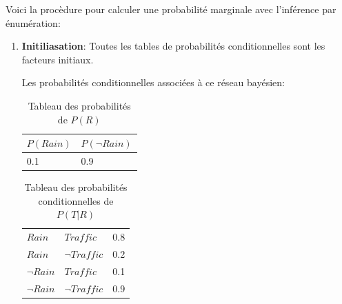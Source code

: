 Voici la procèdure pour calculer une probabilité marginale avec l'inférence par énumération: 

\begin{enumerate}
    \item \textbf{Initiliasation}: Toutes les tables de probabilités conditionnelles sont les facteurs initiaux.
        
    Les probabilités conditionnelles associées à ce réseau bayésien: 
    \begin{table}[H]
        \centering
        \begin{tabular}{|ll|}
            \hline
            $P(Rain)$ & $P(\neg Rain)$ \\ 
            \hline 
            0.1 & 0.9 \\
            \hline 
        \end{tabular}
        \caption{Tableau des probabilités de $P(R)$}
    \end{table}

    \begin{table}[H]
        \centering
        \begin{tabular}{|l|l|l|}
            \hline
            $Rain$ & $Traffic$ & 0.8 \\ 
            $Rain$ & $\neg Traffic$ & 0.2 \\
            $\neg Rain$ & $Traffic$ & 0.1 \\
            $\neg Rain$ & $\neg Traffic$ & 0.9 \\
            \hline
        \end{tabular}
        \caption{Tableau des probabilités conditionnelles de $P(T | R)$}
    \end{table}


\end{enumerate}
